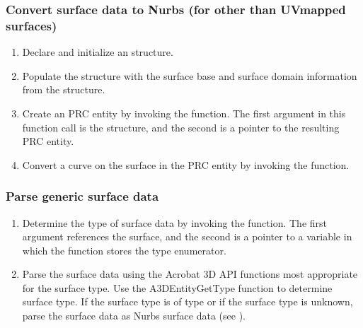 \documentclass[letterpaper,12pt,english,openany,oneside]{sphinxmanual}
\begin{document}
\subsubsection{Convert surface data to Nurbs (for other than UV\sphinxhyphen{}mapped surfaces)}
\label{\detokenize{Plugins_A3D_API:convert-surface-data-to-nurbs-for-other-than-uv-mapped-surfaces}}\begin{enumerate}
%
\item {} 
Declare and initialize an  structure.

\item {} 
Populate the  structure with the surface base and surface domain information from the  structure.

\item {} 
Create an  PRC entity by invoking the  function. The first argument in this function call is the  structure, and the second is a pointer to the resulting PRC entity.

\item {} 
Convert a curve on the surface in the  PRC entity by invoking the  function.

\end{enumerate}


\subsubsection{Parse generic surface data}
\label{\detokenize{Plugins_A3D_API:parse-generic-surface-data}}\begin{enumerate}
%
\item {} 
Determine the type of surface data by invoking the  function. The first argument references the surface, and the second is a pointer to a variable in which the function stores the type enumerator.

\item {} 
Parse the surface data using the Acrobat 3D API functions most appropriate for the surface type. Use the A3DEntityGetType function to determine surface type. If the surface type is of type  or if the surface type is unknown, parse the surface data as Nurbs surface data (see ).

\end{enumerate}
\end{document}
